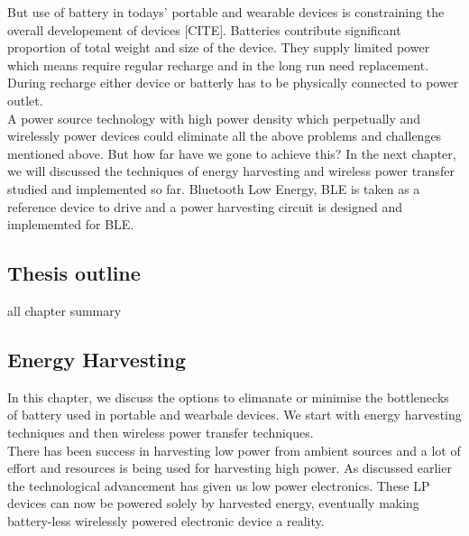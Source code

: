 \documentclass[12pt,a4paper,UKenglish]{article}
\begin{document}
But use of battery in todays'  portable and wearable devices is constraining the overall developement of devices 
[CITE]. Batteries contribute significant proportion of total weight and size of the device. They supply limited 
power which means require regular recharge and in the long run need replacement. During recharge either device or 
batterly has to be physically connected to power outlet. \\

A power source technology with high power density which perpetually and wirelessly power devices could eliminate 
all the above problems and challenges mentioned above. But how 
far have we gone to achieve this? In the next chapter, we will discussed the techniques of energy harvesting and 
wireless power transfer studied and implemented so far. Bluetooth Low Energy, BLE is taken as a 
reference device to drive and a power harvesting circuit is designed and implememted for BLE. \\


\subsection{Thesis outline}

all chapter summary 

\newpage

\subsection{Energy Harvesting}

In this chapter, we discuss the options to elimanate or minimise the bottlenecks of battery used in portable and 
wearbale devices. We start with energy harvesting techniques and then wireless power transfer techniques. \\

There has been success in harvesting low power from ambient sources and a lot of effort and resources is being used for 
harvesting high power. As discussed earlier the technological advancement has given us low power electronics. 
These LP devices can now be powered solely by harvested energy, eventually making battery-less wirelessly powered 
electronic device a reality. \\
\end{document}
